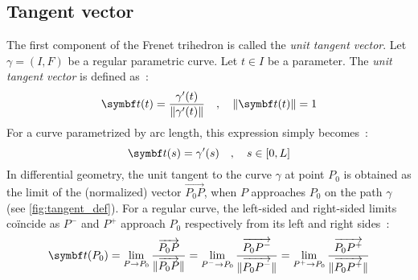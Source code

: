 \subsection{Tangent vector}
The first component of the Frenet trihedron is called the \emph{unit tangent vector}. 
Let $\gamma = (I,F)$ be a regular parametric curve. Let $t \in I$ be a parameter. The \emph{unit tangent vector} is defined as~:
\begin{equation}
	\vect{t}(t) = \frac{\gamma'(t)}{\norm{\gamma'(t)}}
	\quad,\quad
	\norm{\vect{t}(t)}=1
	\label{eq:def_tangent}
\end{equation}
For a curve parametrized by arc length, this expression simply becomes~:
\begin{equation}
	\vect{t}(s) = \gamma'(s)
	\quad,\quad
	s \in [0,L]
\end{equation}
In differential geometry, the unit tangent to the curve $\gamma$ at point $P_0$ is obtained as the limit of the (normalized) vector $\overrightarrow{P_0 P}$, when $P$ approaches $P_0$ on the path $\gamma$ (see \cref{fig:tangent_def}). For a regular curve, the left-sided and right-sided limits coïncide as $P^-$ and $P^+$ approach $P_0$ respectively from its left and right sides~:
\begin{equation}
	\vect{t}(P_0)
	= \lim_{P \to P_0}\frac{\overrightarrow{P_0 P}}{\norm{\overrightarrow{P_0 P}}}
	= \lim_{P^- \to P_0}\frac{\overrightarrow{P_0 P^-}}{\norm{\overrightarrow{P_0 P^-}}}
	= \lim_{P^+ \to P_0}\frac{\overrightarrow{P_0 P^+}}{\norm{\overrightarrow{P_0 P^+}}}
\label{eq:3_4}
\end{equation}


